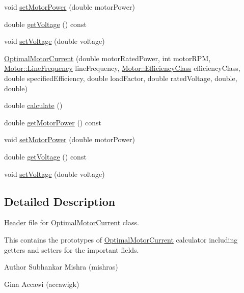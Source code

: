 \begin{DoxyCompactItemize}
void \hyperlink{class_optimal_motor_current_a4950fe2e789f5c150648a846898aff74}{set\+Motor\+Power} (double motor\+Power)
\item 
double \hyperlink{class_optimal_motor_current_a4f9b5f8b83287868a72bfeca97713fd3}{get\+Voltage} () const
\item 
void \hyperlink{class_optimal_motor_current_a71dd261541b67b551e7053d3d6a35f6d}{set\+Voltage} (double voltage)
\item 
\hyperlink{class_optimal_motor_current_a6e88ae5d7005b9790810de4f8892ba15}{Optimal\+Motor\+Current} (double motor\+Rated\+Power, int motor\+R\+PM, \hyperlink{class_motor_acee1bdf1b684ad36cb80dc2829d9fcee}{Motor\+::\+Line\+Frequency} line\+Frequency, \hyperlink{class_motor_afa022971ae062406a9f588c601673d4e}{Motor\+::\+Efficiency\+Class} efficiency\+Class, double specified\+Efficiency, double load\+Factor, double rated\+Voltage, double, double)
\item 
double \hyperlink{class_optimal_motor_current_af2dcf21026f526901ccf2927affecd49}{calculate} ()
\item 
double \hyperlink{class_optimal_motor_current_a345ae983be872a2504c50ff8a96b4fc9}{get\+Motor\+Power} () const
\item 
void \hyperlink{class_optimal_motor_current_a4950fe2e789f5c150648a846898aff74}{set\+Motor\+Power} (double motor\+Power)
\item 
double \hyperlink{class_optimal_motor_current_a4f9b5f8b83287868a72bfeca97713fd3}{get\+Voltage} () const
\item 
void \hyperlink{class_optimal_motor_current_a71dd261541b67b551e7053d3d6a35f6d}{set\+Voltage} (double voltage)
\end{DoxyCompactItemize}


\subsection{Detailed Description}
\hyperlink{class_header}{Header} file for \hyperlink{class_optimal_motor_current}{Optimal\+Motor\+Current} class. 

This contains the prototypes of \hyperlink{class_optimal_motor_current}{Optimal\+Motor\+Current} calculator including getters and setters for the important fields.

\begin{DoxyAuthor}{Author}
Subhankar Mishra (mishras) 

Gina Accawi (accawigk) 
\end{DoxyAuthor}


